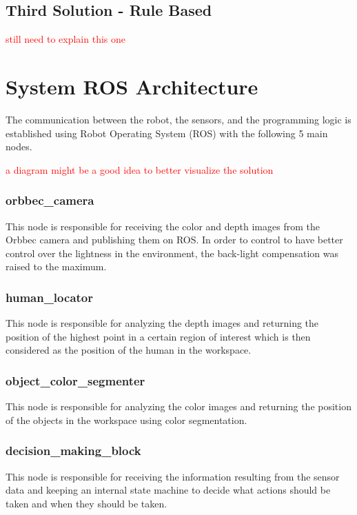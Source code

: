 \subsection{Third Solution - Rule Based}

\textcolor{red}{still need to explain this one}

\section{System ROS Architecture}

The communication between the robot, the sensors, and the programming logic is established using Robot Operating System (ROS) with the following 5 main nodes.

\textcolor{red}{a diagram might be a good idea to better visualize the solution}

\subsubsection{orbbec\_camera}

This node is responsible for receiving the color and depth images from the Orbbec camera and publishing them on ROS. In order to control to have better control over the lightness in the environment, the back-light compensation was raised to the maximum.

\subsubsection{human\_locator}

This node is responsible for analyzing the depth images and returning the position of the highest point in a certain region of interest which is then considered as the position of the human in the workspace.

\subsubsection{object\_color\_segmenter}

This node is responsible for analyzing the color images and returning the position of the objects in the workspace using color segmentation.

\subsubsection{decision\_making\_block}

This node is responsible for receiving the information resulting from the sensor data and keeping an internal state machine to decide what actions should be taken and when they should be taken.

